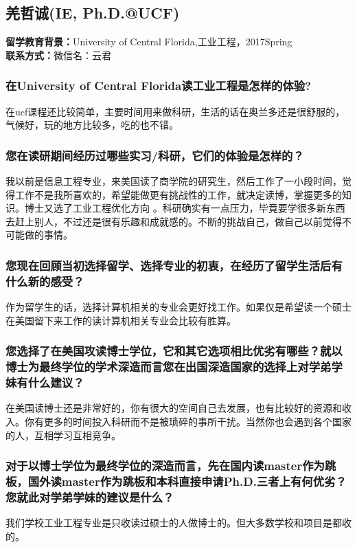 \documentclass[a4paper,UTF8]{book}
\begin{document}
\clearpage
\subsection{羌哲诚(IE, Ph.D.@UCF)}
    \textbf{留学教育背景：}University of Central Florida,工业工程，2017Spring\\
    \textbf{联系方式：}微信名：云君

    \subsubsection*{在University of Central Florida读工业工程是怎样的体验?}
    在ucf课程还比较简单，主要时间用来做科研，生活的话在奥兰多还是很舒服的，气候好，玩的地方比较多，吃的也不错。

    \subsubsection*{您在读研期间经历过哪些实习/科研，它们的体验是怎样的？}
    我以前是信息工程专业，来美国读了商学院的研究生，然后工作了一小段时间，觉得工作不是我所喜欢的，希望能做更有挑战性的工作，就决定读博，掌握更多的知识。博士又选了工业工程优化方向 。科研确实有一点压力，毕竟要学很多新东西去赶上别人，不过还是很有乐趣和成就感的。不断的挑战自己，做自己以前觉得不可能做的事情。

    \subsubsection*{您现在回顾当初选择留学、选择专业的初衷，在经历了留学生活后有什么新的感受？}
    作为留学生的话，选择计算机相关的专业会更好找工作。如果仅是希望读一个硕士在美国留下来工作的读计算机相关专业会比较有胜算。

    \subsubsection*{您选择了在美国攻读博士学位，它和其它选项相比优劣有哪些？就以博士为最终学位的学术深造而言您在出国深造国家的选择上对学弟学妹有什么建议？}
    在美国读博士还是非常好的，你有很大的空间自己去发展，也有比较好的资源和收入。你有更多的时间投入科研而不是被琐碎的事所干扰。当然你也会遇到各个国家的人，互相学习互相竞争。 

    \subsubsection*{对于以博士学位为最终学位的深造而言，先在国内读master作为跳板，国外读master作为跳板和本科直接申请Ph.D.三者上有何优劣？您就此对学弟学妹的建议是什么？}
    我们学校工业工程专业是只收读过硕士的人做博士的。但大多数学校和项目是都收的。
\end{document}
